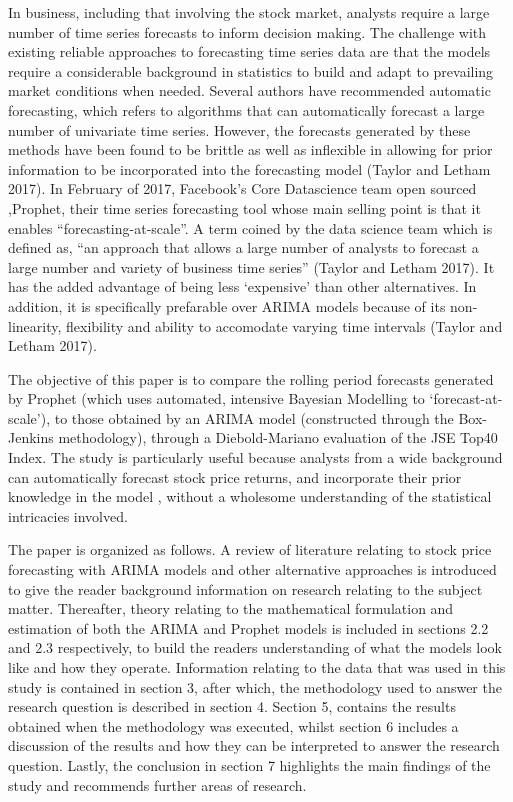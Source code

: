 \documentclass[12pt,a4paper]{article}
\numberwithin{equation}{section}
\numberwithin{figure}{section}
\numberwithin{table}{section}
\begin{document}
In business, including that involving the stock market, analysts require
a large number of time series forecasts to inform decision making. The
challenge with existing reliable approaches to forecasting time series
data are that the models require a considerable background in statistics
to build and adapt to prevailing market conditions when needed. Several
authors have recommended automatic forecasting, which refers to
algorithms that can automatically forecast a large number of univariate
time series. However, the forecasts generated by these methods have been
found to be brittle as well as inflexible in allowing for prior
information to be incorporated into the forecasting model (Taylor and
Letham 2017). In February of 2017, Facebook's Core Datascience team open
sourced ,Prophet, their time series forecasting tool whose main selling
point is that it enables ``forecasting-at-scale''. A term coined by the
data science team which is defined as, ``an approach that allows a large
number of analysts to forecast a large number and variety of business
time series'' (Taylor and Letham 2017). It has the added advantage of
being less `expensive' than other alternatives. In addition, it is
specifically prefarable over ARIMA models because of its non-linearity,
flexibility and ability to accomodate varying time intervals (Taylor and
Letham 2017).

The objective of this paper is to compare the rolling period forecasts
generated by Prophet (which uses automated, intensive Bayesian Modelling
to `forecast-at-scale'), to those obtained by an ARIMA model
(constructed through the Box-Jenkins methodology), through a
Diebold-Mariano evaluation of the JSE Top40 Index. The study is
particularly useful because analysts from a wide background can
automatically forecast stock price returns, and incorporate their prior
knowledge in the model , without a wholesome understanding of the
statistical intricacies involved.

The paper is organized as follows. A review of literature relating to
stock price forecasting with ARIMA models and other alternative
approaches is introduced to give the reader background information on
research relating to the subject matter. Thereafter, theory relating to
the mathematical formulation and estimation of both the ARIMA and
Prophet models is included in sections 2.2 and 2.3 respectively, to
build the readers understanding of what the models look like and how
they operate. Information relating to the data that was used in this
study is contained in section 3, after which, the methodology used to
answer the research question is described in section 4. Section 5,
contains the results obtained when the methodology was executed, whilst
section 6 includes a discussion of the results and how they can be
interpreted to answer the research question. Lastly, the conclusion in
section 7 highlights the main findings of the study and recommends
further areas of research.
\end{document}
